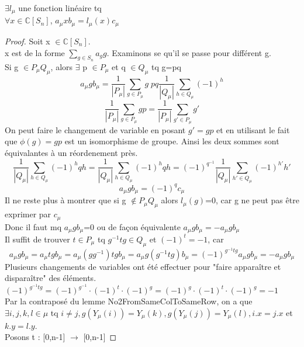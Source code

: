 \begin{lemma}[LinearTransformation]
    \label{LinearTransformation}
    $\exists l_{\mu}$ une fonction linéaire tq\\
    $\forall x \in \mathbb{C}[S_{n}]$, $a_{\mu} x b_{\mu} = l_{\mu}(x) c_{\mu}$
\end{lemma}
\begin{proof}
    Soit x $\in \mathbb{C}[S_{n}]$.\\
    x est de la forme $\sum_{g \in S_n} a_g g$. Examinons se qu'il se passe pour différent g.\\
    Si g $\in P_{\mu} Q_{\mu}$, alors $\exists$ p $\in P_{\mu}$ et q $\in Q_{\mu}$ tq g=pq\\
    \[ a_{\mu} g b_{\mu} = \frac{1}{|P_{\mu}|}\sum_{g \in P_{\mu}}g \; p q \frac{1}{|Q_{\mu}|}\sum_{h \in Q_{\mu}}(-1)^{h} \]
    \[ \frac{1}{|P_{\mu}|}\sum_{g \in P_{\mu}}g p = \frac{1}{|P_{\mu}|}\sum_{g' \in P_{\mu}}g' \]
    On peut faire le changement de variable en posant $g' = g p$ et en utilisant le fait que $\phi (g) =g p$ est un isomorphisme de groupe. Ainsi les deux sommes sont équivalantes à un réordenement près.
    \[ \frac{1}{|Q_{\mu}|}\sum_{h \in Q_{\mu}}(-1)^{h}q h = \frac{1}{|Q_{\mu}|}\sum_{h \in Q_{\mu}}(-1)^{h}q h = (-1)^{q^{-1}} \frac{1}{|Q_{\mu}|}\sum_{h' \in Q_{\mu}}(-1)^{h'}h' \]
    \[ a_{\mu} g b_{\mu} = (-1)^{q}c_{\mu} \]
    Il ne reste plus à montrer que si g $\notin P_{\mu} Q_{\mu}$ alors $l_{\mu}(g)$=0, car g ne peut pas être exprimer par $c_{\mu}$\\
    Donc il faut mq $a_{\mu} g b_{\mu}$=0 ou de façon équivalente $a_{\mu} g b_{\mu} = -a_{\mu} g b_{\mu}$\\
    Il suffit de trouver $t \in P_{\mu}$ tq $g^{-1} t g \in Q_{\mu}$ et $(-1)^t = -1$, car
    \[ a_{\mu} g b_{\mu} = a_{\mu} t g b_{\mu} = a_{\mu} (g g^{-1}) t g b_{\mu} = a_{\mu} g (g^{-1} t g) b_{\mu} = (-1)^{g^{-1} t g} a_{\mu} g b_{\mu} = -a_{\mu} g b_{\mu} \]
    Plusieurs changements de variables ont été effectuer pour "faire apparaître et disparaître" des éléments. $(-1)^{g^{-1} t g} = (-1)^{g^{-1}}\cdot (-1)^{t}\cdot (-1)^{g} = (-1)^{g}\cdot (-1)^{t}\cdot (-1)^{g} = -1$\\
    Par la contraposé du lemme No2FromSameColToSameRow, on a que\\
    $\exists i,j,k,l \in \mu$ tq $i \neq j, g(Y_{\mu}(i))=Y_{\mu}(k), g(Y_{\mu}(j))=Y_{\mu}(l), i.x=j.x$ et $k.y = l.y$.\\
    Posons t : [0,n-1] $\to$ [0,n-1]

\end{proof}
